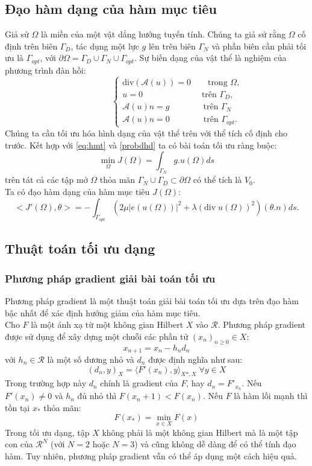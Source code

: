 \documentclass[
12pt, %
oneside, %
english, %
onehalfspacing, %
nolistspacing, %
headsepline, %
addchap,
]{MastersDoctoralThesis} %
\begin{document}
\subsection*{Đạo hàm dạng của hàm mục tiêu}
Giả sử $\Omega$ là miền của một vật dẳng hướng tuyến tính. Chúng ta giả sử rằng $\Omega$ cố định trên biên $\Gamma_D$, tác dụng một lực $g$ lên trên biên $\Gamma_N$ và phần biên cần phải tối ưu là $\Gamma_{opt}$, với $\partial\Omega = \Gamma_D\cup\Gamma_N\cup\Gamma_{opt}$. Sự biến dạng của vật thể là nghiệm của phương trình đàn hồi:
\begin{equation}\label{probdhd}
\quad\quad\quad\quad\quad
\begin{cases}
\text{div}(\mathcal{A}(u)) = 0 \qquad \text{trong } \Omega,\\
u = 0 \quad\qquad\qquad\qquad \text{trên } \Gamma_D, \\
\mathcal{A}(u)n = g \qquad\qquad \text{trên } \Gamma_N \\
\mathcal{A}(u)n = 0 \qquad\qquad \text{trên } \Gamma_{opt}.
\end{cases}
\end{equation}
Chúng ta cần tối ưu hóa hình dạng của vật thể trên với thể tích cố định cho trước.  Kết hợp với \ref{eq:hmt} và \ref{probdhd} ta có bài toán tối ưu ràng buộc:
$$\min_\Omega J(\Omega) = \int_{\Gamma_N}g.u(\Omega)ds$$
trên tát cả các tập mở $\Omega$ thỏa mãn $\Gamma_N\cup\Gamma_D\subset\partial\Omega$ có thể tích là $V_0$.\\
Ta có đạo hàm dạng của hàm mục tiêu $J(\Omega)$:
$$<J'(\Omega), \theta> = -\int_{\Gamma_{opt}}(2\mu|e(u(\Omega))|^2+\lambda(\text{div}\;u(\Omega))^2)(\theta.n)ds.$$
\subsection{Thuật toán tối ưu dạng}
\subsubsection*{Phương pháp gradient giải bài toán tối ưu}
Phương pháp gradient là một thuật toán giải bài toán tối ưu dựa trên đạo hàm bậc nhất để xác định hướng giảm của hàm mục tiêu.\\
Cho $F$ là một ánh xạ từ một không gian Hilbert $X$ vào $\mathcal{R}$. Phương pháp gradient được sử dụng để xây dựng một chuỗi các phần tử $(x_n)_{n\geq 0}\in X$:
$$x_{n+1} = x_n - h_nd_n$$
với $h_n \in\mathcal{R}$ là một số dương nhỏ và $d_n$ được định nghĩa như sau:
$$(d_n , y )_X  = \langle F'(x_n),y \rangle_{X * , X} \; \forall y \in X$$
Trong trường hợp này $d_n$ chính là gradient của $F$, hay $d_n = F'_{x_n}$. Nếu $F'(x_n) \neq 0$ và $h_n$ đủ nhỏ thì $F(x_n + 1) < F(x_n)$. Nếu $F$ là hàm lồi mạnh thì tồn tại $x_*$ thỏa mãn:
$$F(x_*)=\min_{x\in X}F(x)$$
Trong tối ưu dạng, tập $X$ không phải là một không gian Hilbert mà là một tập con của $\mathcal{R}^N$ (với $N=2$ hoặc $N=3$) và cũng không dễ dàng để có thể tính đạo hàm. Tuy nhiên, phương pháp gradient vẫn có thể áp dụng một cách hiệu quả.
\end{document}
